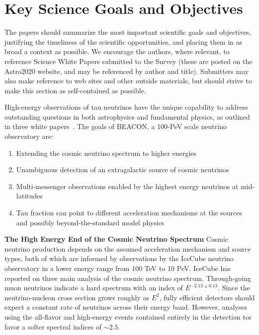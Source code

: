 \documentclass[12pt]{article}
\begin{document}
\section{Key Science Goals and Objectives}
\color{blue}
The papers should summarize the most important scientific goals and objectives, justifying the timeliness of the scientific opportunities, and placing them in as broad a context as possible. We encourage the authors, where relevant, to reference Science White Papers submitted to the Survey (these are posted on the Astro2020 website, and may be referenced by author and title). Submitters may also make reference to web sites and other outside materials, but should strive to make this section as self-contained as possible.
\color{black}

High-energy observations of tau neutrinos have the unique capability to address outstanding questions in both astrophysics and fundamental physics, as outlined in three white papers~\cite{Astro2020_fundamental, Astro2020_astrophysics, Astro2020_blazars}. The goals of BEACON, a 100-PeV scale neutrino observatory are:
\begin{enumerate}
	\item Extending the cosmic neutrino spectrum to higher energies	\item Unambiguous detection of an extragalactic source of cosmic neutrinos
 	\item Multi-messenger observations enabled by the highest energy neutrinos at mid-latitudes
	\item Tau fraction can point to different acceleration mechanisms at the sources and possibly beyond-the-standard model physics
\end{enumerate}

\textbf{The High Energy End of the Cosmic Neutrino Spectrum} Cosmic neutrino production depends on the assumed acceleration mechanism and source types, both of which are informed by observations by the IceCube neutrino observatory in a lower energy range from 100 TeV to 10 PeV. IceCube has reported on three main analysis of the cosmic neutrino spectrum. Through-going muon neutrinos indicate a hard spectrum with an index of $E^{-2.13\pm0.13}$. Since the neutrino-nucleon cross section grows roughly as $E^{2}$, fully efficient detectors should expect a constant rate of neutrinos across their energy band. However, analyses using the all-flavor and high-energy events contained entirely in the detection tor favor a softer spectral indices of $\sim2.5$. 
\end{document}
